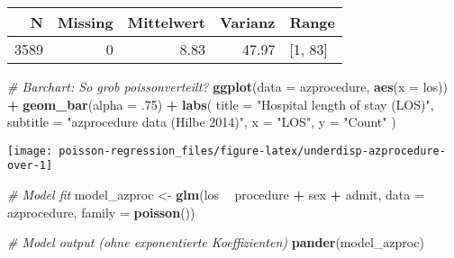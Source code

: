 \documentclass[ngerman,a4paper,]{scrartcl}
\newenvironment{Shaded}{\begin{snugshade}}{\end{snugshade}}
\newcommand{\CommentTok}[1]{\textcolor[rgb]{0.56,0.35,0.01}{\textit{#1}}}
\newcommand{\DataTypeTok}[1]{\textcolor[rgb]{0.13,0.29,0.53}{#1}}
\newcommand{\FloatTok}[1]{\textcolor[rgb]{0.00,0.00,0.81}{#1}}
\newcommand{\KeywordTok}[1]{\textcolor[rgb]{0.13,0.29,0.53}{\textbf{#1}}}
\newcommand{\NormalTok}[1]{#1}
\newcommand{\OperatorTok}[1]{\textcolor[rgb]{0.81,0.36,0.00}{\textbf{#1}}}
\newcommand{\StringTok}[1]{\textcolor[rgb]{0.31,0.60,0.02}{#1}}
\theoremstyle{definition}
\theoremstyle{definition}
\theoremstyle{definition}
\theoremstyle{remark}
\begin{document}
\begin{table}[H]
\centering
\begin{tabular}{rrrrl}
\toprule
N & Missing & Mittelwert & Varianz & Range\\
\midrule
3589 & 0 & 8.83 & 47.97 & [1, 83]\\
\bottomrule
\end{tabular}
\end{table}

\begin{Shaded}
\begin{Highlighting}[]
\CommentTok{# Barchart: So grob poissonverteilt?}
\KeywordTok{ggplot}\NormalTok{(}\DataTypeTok{data =}\NormalTok{ azprocedure, }\KeywordTok{aes}\NormalTok{(}\DataTypeTok{x =}\NormalTok{ los)) }\OperatorTok{+}
\StringTok{  }\KeywordTok{geom_bar}\NormalTok{(}\DataTypeTok{alpha =} \FloatTok{.75}\NormalTok{) }\OperatorTok{+}
\StringTok{  }\KeywordTok{labs}\NormalTok{(}
    \DataTypeTok{title =} \StringTok{"Hospital length of stay (LOS)"}\NormalTok{,}
    \DataTypeTok{subtitle =} \StringTok{"azprocedure data (Hilbe 2014)"}\NormalTok{,}
    \DataTypeTok{x =} \StringTok{"LOS"}\NormalTok{, }\DataTypeTok{y =} \StringTok{"Count"} 
\NormalTok{  )}
\end{Highlighting}
\end{Shaded}

\begin{center}\texttt{[image: poisson-regression\_files/figure-latex/underdisp-azprocedure-over-1]} \end{center}

\begin{Shaded}
\begin{Highlighting}[]
\CommentTok{# Model fit}
\NormalTok{model_azproc <-}\StringTok{ }\KeywordTok{glm}\NormalTok{(los }\OperatorTok{~}\StringTok{ }\NormalTok{procedure }\OperatorTok{+}\StringTok{ }\NormalTok{sex }\OperatorTok{+}\StringTok{ }\NormalTok{admit, }
                    \DataTypeTok{data =}\NormalTok{ azprocedure, }\DataTypeTok{family =} \KeywordTok{poisson}\NormalTok{())}
 
\CommentTok{# Model output (ohne exponentierte Koeffizienten)}
\KeywordTok{pander}\NormalTok{(model_azproc)}
\end{Highlighting}
\end{Shaded}
\end{document}
